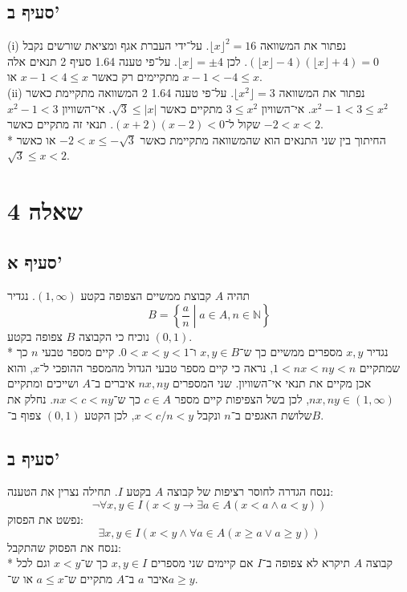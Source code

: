 \documentclass[a4paper]{article}
\def\NN{\mathbb{N}}
\begin{document}
\subsection{סעיף ב'}
(i) נפתור את המשוואה $\lfloor x \rfloor^2 = 16$.
על־ידי העברת אגף ומציאת שורשים נקבל
$(\lfloor x \rfloor - 4)(\lfloor x \rfloor + 4) = 0$.
לכן $\lfloor x \rfloor = \pm 4$.
על־פי טענה 1.64 סעיף 2 תנאים אלה מתקיימים רק כאשר $x - 1 < 4 \le x$
או $x - 1 < -4 \le x$. \\
(ii) נפתור את המשוואה $\lfloor x^2 \rfloor = 3$.
על־פי טענה 1.64 2 המשוואה מתקיימת כאשר $x^2 - 1 < 3 \le x^2$.
אי־השוויון $3 \le x^2$ מתקיים כאשר $\sqrt{3} \le |x|$.
אי־השוויון $x^2 - 1 < 3$ שקול ל־$(x + 2)(x - 2) < 0$.
תנאי זה מתקיים כאשר $-2 < x < 2$. \\*
החיתוך בין שני התנאים הוא שהמשוואה מתקיימת כאשר
$-2 < x \le -\sqrt{3}$ או כאשר $\sqrt{3} \le x < 2$.

\section{שאלה 4}
\subsection{סעיף א'}
תהיה $A$ קבוצת ממשיים הצפופה בקטע $(1, \infty)$. נגדיר
\[
	B = \left\{ \frac{a}{n} \middle| a \in A, n \in \NN \right\}
\]
נוכיח כי הקבוצה $B$ צפופה בקטע $(0, 1)$. \\*
נגדיר $x, y$ מספרים ממשיים כך ש־$x, y \in B$ ו־$0 < x < y < 1$.
קיים מספר טבעי $n$ כך שמתקיים $1 < nx < ny < n$,
נראה כי קיים מספר טבעי הגדול מהמספר ההופכי ל־$x$,
והוא אכן מקיים את תנאי אי־השוויון.
שני המספרים $nx, ny$ איברים ב־$A$
ושייכים ומתקיים $nx, ny \in (1, \infty)$,
לכן בשל הצפיפות קיים מספר $c \in A$ כך ש־$nx < c < ny$.
נחלק את שלושת האגפים ב־$n$ ונקבל $x < c/n < y$,
לכן הקטע $(0, 1)$ צפוף ב־$B$.

\subsection{סעיף ב'}
ננסח הגדרה לחוסר רציפות של קבוצה $A$ בקטע $I$.
תחילה נצרין את הטענה:
\[
	\lnot \forall x, y \in I
	(x < y \rightarrow \exists a \in A (x < a \land a < y)) 
\]
נפשט את הפסוק:
\[
	\exists x, y \in I
	(x < y \land \forall a \in A (x \ge a \lor a \ge y))
\]
ננסח את הפסוק שהתקבל: \\*
קבוצה $A$ תיקרא לא צפופה ב־$I$ אם קיימים שני מספרים $x, y \in I$
כך ש־$x < y$ וגם לכל איבר $a$ ב־$A$ מתקיים ש־$a \le x$ או ש־$a \ge y$.
\end{document}
